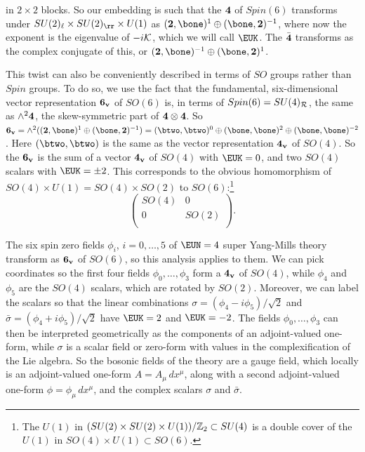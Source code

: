 in $2\times 2$ blocks.  So our embedding is such that the ${\bf
4}$ of $Spin(6)$ transforms under $SU(2)_\ell\times
SU(2)_\rr\times U(1)$ as $({\bf 2},\bone)^{1}\oplus (\bone,{\bf
2})^{-1}$, where now the exponent is the eigenvalue of $-i{\cal
K}$, which we will call ${\EUK}$. The $\bar{\bf 4}$ transforms as
the complex conjugate of this, or $({\bf 2},\bone)^{-1}\oplus
(\bone,{\bf 2})^{1}$.

This twist can also be conveniently described in terms of $SO$
groups rather than $Spin$ groups.  To do so, we use the fact that
the fundamental, six-dimensional vector representation ${\bf 6_v}$
of $SO(6)$ is, in terms of $Spin(6)=SU(4)_{{\cal R}}$, the same as
$\wedge^2 {\bf 4}$, the skew-symmetric part of ${\bf 4}\otimes{\bf
4}$. So ${\bf 6_v}=\wedge^2(({\bf 2},\bone)^{1}\oplus (\bone,{\bf
2})^{-1})=(\btwo,\btwo)^0\oplus (\bone,\bone)^2\oplus
(\bone,\bone)^{-2}$.  Here $(\btwo,\btwo)$ is the same as the
vector representation ${\bf 4_v}$ of $SO(4)$. So the ${\bf 6_v}$
is the sum of a vector ${\bf 4_v}$ of $SO(4)$ with ${\EUK}=0$, and
two $SO(4)$  scalars with ${\EUK}=\pm 2$. This corresponds to the
obvious homomorphism of $SO(4)\times U(1)=SO(4)\times SO(2)$ to
$SO(6)$:\footnote{The $U(1)$ in $(SU(2)\times SU(2)\times
U(1))/\Bbb{Z}_2\subset SU(4)$ is a double cover of the $U(1)$ in
$SO(4)\times U(1)\subset SO(6)$.} %
\setcounter{equation}{3}
\begin{equation}\label{eq:tomo}
\left(\begin{matrix}SO(4) &
0 \\ 0 & SO(2)\\\end{matrix}\right).
\end{equation}

The six spin zero fields $\phi_i$, $i=0,\dots,5$ of ${\EUN}=4$
super Yang-Mills theory transform as ${\bf 6_v}$ of $SO(6)$, so
this analysis applies to them.  We can pick coordinates so the
first four fields $\phi_0,\dots,\phi_3$ form a ${\bf 4_v}$ of
$SO(4)$, while $\phi_4$ and $\phi_5$ are the $SO(4)$ scalars,
which are rotated by $SO(2)$.  Moreover, we can label the scalars
so that the linear combinations $\sigma=(\phi_4-i\phi_5)/\sqrt 2$
and $\bar\sigma=(\phi_4+i\phi_5)/\sqrt 2$ have ${\EUK}=2$ and
${\EUK}=-2$. The fields $\phi_0,\dots,\phi_3$ can then be
interpreted geometrically as the components of an adjoint-valued
one-form, while $\sigma$ is a scalar field or zero-form with
values in the complexification of the Lie algebra.  So the bosonic
fields of the theory are a gauge field, which locally is an
adjoint-valued one-form $A=A_\mu \,dx^\mu$, along with a second
adjoint-valued one-form $\phi=\phi_\mu\,dx^\mu$, and the complex
scalars $\sigma$ and $\bar\sigma$.

